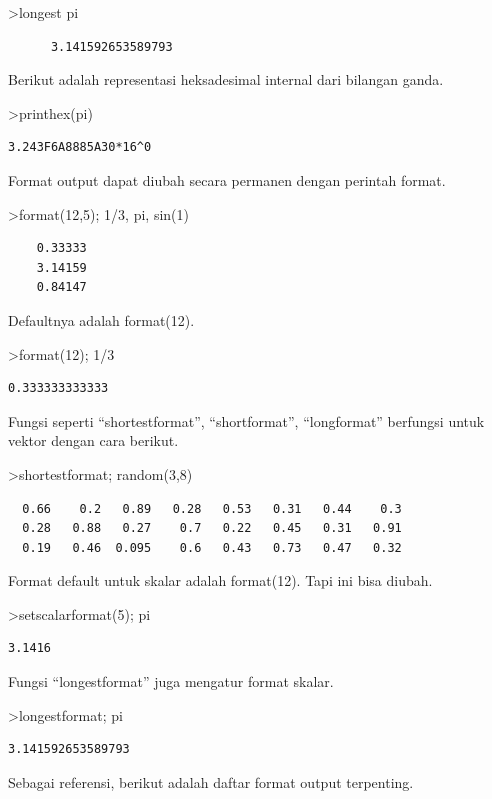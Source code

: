 \documentclass[
]{book}
\begin{document}
\textgreater longest pi

\begin{verbatim}
      3.141592653589793 
\end{verbatim}

Berikut adalah representasi heksadesimal internal dari bilangan ganda.

\textgreater printhex(pi)

\begin{verbatim}
3.243F6A8885A30*16^0
\end{verbatim}

Format output dapat diubah secara permanen dengan perintah format.

\textgreater format(12,5); 1/3, pi, sin(1)

\begin{verbatim}
    0.33333 
    3.14159 
    0.84147 
\end{verbatim}

Defaultnya adalah format(12).

\textgreater format(12); 1/3

\begin{verbatim}
0.333333333333
\end{verbatim}

Fungsi seperti ``shortestformat'', ``shortformat'', ``longformat'' berfungsi untuk vektor dengan cara berikut.

\textgreater shortestformat; random(3,8)

\begin{verbatim}
  0.66    0.2   0.89   0.28   0.53   0.31   0.44    0.3 
  0.28   0.88   0.27    0.7   0.22   0.45   0.31   0.91 
  0.19   0.46  0.095    0.6   0.43   0.73   0.47   0.32 
\end{verbatim}

Format default untuk skalar adalah format(12). Tapi ini bisa diubah.

\textgreater setscalarformat(5); pi

\begin{verbatim}
3.1416
\end{verbatim}

Fungsi ``longestformat'' juga mengatur format skalar.

\textgreater longestformat; pi

\begin{verbatim}
3.141592653589793
\end{verbatim}

Sebagai referensi, berikut adalah daftar format output terpenting.
\end{document}
